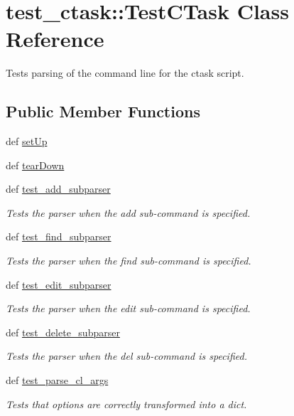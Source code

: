 \hypertarget{classtest__ctask_1_1TestCTask}{
\section{test\-\_\-ctask\-:\-:\-Test\-C\-Task \-Class \-Reference}
\label{classtest__ctask_1_1TestCTask}
}


\-Tests parsing of the command line for the ctask script.  


\subsection*{\-Public \-Member \-Functions}
\begin{DoxyCompactItemize}
\item 
def \hyperlink{classtest__ctask_1_1TestCTask_ac2b990e80afb15bc40b3ce737596a1d3}{set\-Up}
\item 
def \hyperlink{classtest__ctask_1_1TestCTask_a3130d849eedea4a6473e38bd3b26c572}{tear\-Down}
\item 
def \hyperlink{classtest__ctask_1_1TestCTask_a9417196e5f2414a02d8a90e8f28ca517}{test\-\_\-add\-\_\-subparser}
\begin{DoxyCompactList}\small\item\em \-Tests the parser when the add sub-\/command is specified. \end{DoxyCompactList}\item 
def \hyperlink{classtest__ctask_1_1TestCTask_a4599d2f1c1d3ab69ff08a1481cea15d9}{test\-\_\-find\-\_\-subparser}
\begin{DoxyCompactList}\small\item\em \-Tests the parser when the find sub-\/command is specified. \end{DoxyCompactList}\item 
def \hyperlink{classtest__ctask_1_1TestCTask_ad6d78332e27eb6b7ee1c7100296a8800}{test\-\_\-edit\-\_\-subparser}
\begin{DoxyCompactList}\small\item\em \-Tests the parser when the edit sub-\/command is specified. \end{DoxyCompactList}\item 
def \hyperlink{classtest__ctask_1_1TestCTask_a8499a5d20427be6f0fe8876753a14acb}{test\-\_\-delete\-\_\-subparser}
\begin{DoxyCompactList}\small\item\em \-Tests the parser when the del sub-\/command is specified. \end{DoxyCompactList}\item 
def \hyperlink{classtest__ctask_1_1TestCTask_aba1a6e0e712bb178fc717a0f909a4a09}{test\-\_\-parse\-\_\-cl\-\_\-args}
\begin{DoxyCompactList}\small\item\em \-Tests that options are correctly transformed into a dict. \end{DoxyCompactList}\end{DoxyCompactItemize}
